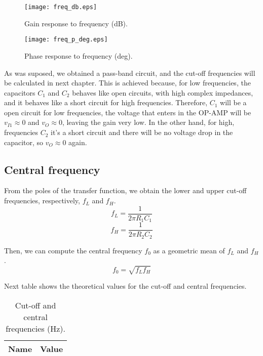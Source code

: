 \begin{figure}[H] \centering
  \texttt{[image: freq\_db.eps]}
  \caption{Gain response to frequency (dB).}
  \label{fig:gain}
\end{figure}

\begin{figure}[H] \centering
  \texttt{[image: freq\_p\_deg.eps]}
  \caption{Phase response to frequency (deg).}
  \label{fig:phase}
\end{figure}
 
\par As was suposed, we obtained a pass-band circuit, and the cut-off frequencies will be calculated in next chapter. This is achieved because, for low frequencies, the capacitors $C_1$ and $C_2$ behaves like open circuits, with high complex impedances, and it behaves like a short circuit for high frequencies. Therefore, $C_1$ will be a open circuit for low frequencies, the voltage that enters in the OP-AMP will be $v_{I1}\approx 0$ and $v_{O}\approx 0$, leaving the gain very low. In the other hand, for high, frequencies $C_2$ it's a short circuit and there will be no voltage drop in the capacitor, so $v_O\approx 0$ again.
 
\subsection{Central frequency}
\par From the poles of the transfer function, we obtain the lower and upper cut-off frequencies, respectively, $f_L$ and $f_H$.
\begin{equation}
  f_L=\frac{1}{2\pi R_1C_1}
\end{equation}
\begin{equation}
  f_H=\frac{1}{2\pi R_2C_2}
\end{equation}
\par Then, we can compute the central frequency $f_0$ as a geometric mean of $f_L$ and $f_H$.
\begin{equation}
  f_0=\sqrt{f_Lf_H}
\end{equation}
 
\par Next table shows the theoretical values for the cut-off and central frequencies.

\begin{table}[H]
  \centering
  \begin{tabular}{|l|r|}
    \hline    
    {\bf Name} & {\bf Value} \\ \hline
    
  \end{tabular}
  \caption{Cut-off and central frequencies (Hz).}
  \label{tab:freq}
\end{table}

